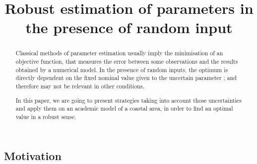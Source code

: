 \documentclass[npg]{copernicus}
\begin{document}
\title{Robust estimation of parameters in the presence of random input}%













\received{}
\pubdiscuss{} %
\revised{}
\accepted{}
\published{}




\maketitle



\begin{abstract}
Classical methods of parameter estimation usually imply the minimisation of an objective function, that measures the error between some observations and the results obtained by a numerical model. In the presence of random inputs, the optimum is directly dependent on the fixed nominal value given to the uncertain parameter ; and therefore may not be relevant in other conditions.

In this paper, we are going to present strategies taking into account those uncertainties and apply them on an academic model of a coastal area, in order to find an optimal value in a robust sense.
\end{abstract}




\introduction%
\subsection{Motivation}
\cite{das_estimation_1991,das_variational_1992}
\end{document}
